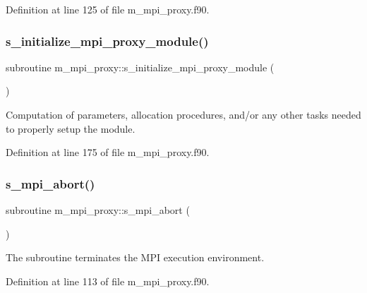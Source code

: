 Definition at line 125 of file m\+\_\+mpi\+\_\+proxy.\+f90.

\mbox{\label{namespacem__mpi__proxy_a015ee2c0892e9cfcb858da8f27b646d5}} 
\subsubsection{\texorpdfstring{s\+\_\+initialize\+\_\+mpi\+\_\+proxy\+\_\+module()}{s\_initialize\_mpi\_proxy\_module()}}
{\footnotesize\ttfamily subroutine m\+\_\+mpi\+\_\+proxy\+::s\+\_\+initialize\+\_\+mpi\+\_\+proxy\+\_\+module (\begin{DoxyParamCaption}{ }\end{DoxyParamCaption})}



Computation of parameters, allocation procedures, and/or any other tasks needed to properly setup the module. 



Definition at line 175 of file m\+\_\+mpi\+\_\+proxy.\+f90.

\mbox{\label{namespacem__mpi__proxy_a04ac565bad2b22dc045a5eeb4f516e2e}} 
\subsubsection{\texorpdfstring{s\+\_\+mpi\+\_\+abort()}{s\_mpi\_abort()}}
{\footnotesize\ttfamily subroutine m\+\_\+mpi\+\_\+proxy\+::s\+\_\+mpi\+\_\+abort (\begin{DoxyParamCaption}{ }\end{DoxyParamCaption})}



The subroutine terminates the M\+PI execution environment. 



Definition at line 113 of file m\+\_\+mpi\+\_\+proxy.\+f90.

\mbox{\label{namespacem__mpi__proxy_abfbc42cea69273bc9fa4a2d78f636eb1}} 
